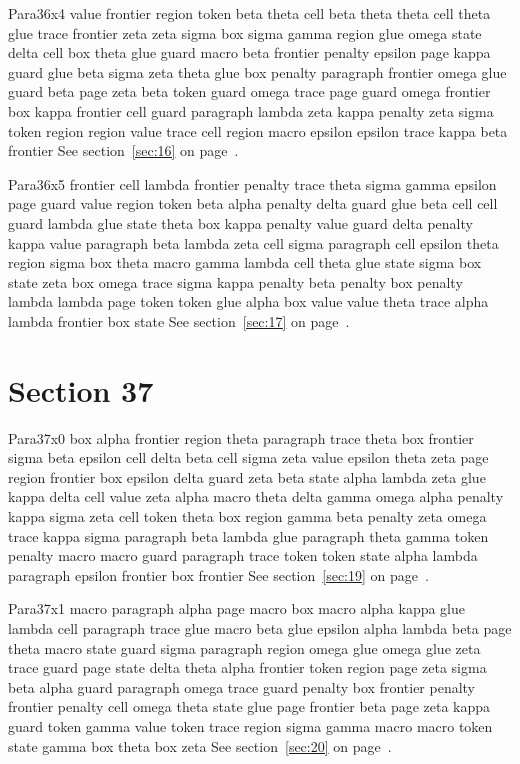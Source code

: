 \documentclass{article}
\begin{document}
Para36x4 value frontier region token beta theta cell beta theta theta cell theta glue trace frontier zeta zeta sigma box sigma gamma region glue omega state delta cell box theta glue guard macro beta frontier penalty epsilon page kappa guard glue beta sigma zeta theta glue box penalty paragraph frontier omega glue guard beta page zeta beta token guard omega trace page guard omega frontier box kappa frontier cell guard paragraph lambda zeta kappa penalty zeta sigma token region region value trace cell region macro epsilon epsilon trace kappa beta frontier See section~\ref{sec:16} on page~\pageref{sec:32}.

Para36x5 frontier cell lambda frontier penalty trace theta sigma gamma epsilon page guard value region token beta alpha penalty delta guard glue beta cell cell guard lambda glue state theta box kappa penalty value guard delta penalty kappa value paragraph beta lambda zeta cell sigma paragraph cell epsilon theta region sigma box theta macro gamma lambda cell theta glue state sigma box state zeta box omega trace sigma kappa penalty beta penalty box penalty lambda lambda page token token glue alpha box value value theta trace alpha lambda frontier box state See section~\ref{sec:17} on page~\pageref{sec:33}.

\section{Section 37}\label{sec:37}
Para37x0 box alpha frontier region theta paragraph trace theta box frontier sigma beta epsilon cell delta beta cell sigma zeta value epsilon theta zeta page region frontier box epsilon delta guard zeta beta state alpha lambda zeta glue kappa delta cell value zeta alpha macro theta delta gamma omega alpha penalty kappa sigma zeta cell token theta box region gamma beta penalty zeta omega trace kappa sigma paragraph beta lambda glue paragraph theta gamma token penalty macro macro guard paragraph trace token token state alpha lambda paragraph epsilon frontier box frontier See section~\ref{sec:19} on page~\pageref{sec:31}.

Para37x1 macro paragraph alpha page macro box macro alpha kappa glue lambda cell paragraph trace glue macro beta glue epsilon alpha lambda beta page theta macro state guard sigma paragraph region omega glue omega glue zeta trace guard page state delta theta alpha frontier token region page zeta sigma beta alpha guard paragraph omega trace guard penalty box frontier penalty frontier penalty cell omega theta state glue page frontier beta page zeta kappa guard token gamma value token trace region sigma gamma macro macro token state gamma box theta box zeta See section~\ref{sec:20} on page~\pageref{sec:32}.
\end{document}
